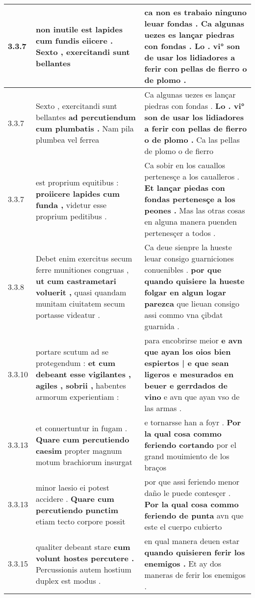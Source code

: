 \begin{tabular}{|p{1cm}|p{6.5cm}|p{6.5cm}|}
3.3.7 & non inutile est lapides \textbf{ cum fundis eiicere . } Sexto , exercitandi sunt bellantes & ca non es trabaio ninguno leuar fondas . \textbf{ Ca algunas uezes es lançar piedras con fondas . } Lo . vi° son de usar los lidiadores a ferir con pellas de fierro o de plomo . \\\hline
3.3.7 & Sexto , exercitandi sunt bellantes \textbf{ ad percutiendum cum plumbatis . } Nam pila plumbea vel ferrea & Ca algunas uezes es lançar piedras con fondas . \textbf{ Lo . vi° son de usar los lidiadores a ferir con pellas de fierro o de plomo . } Ca las pellas de plomo o de fierro \\\hline
3.3.7 & est proprium equitibus : \textbf{ proiicere lapides cum funda , } videtur esse proprium peditibus . & Ca sobir en los cauallos pertenesçe a los caualleros . \textbf{ Et lançar piedas con fondas pertenesçe a los peones . } Mas las otras cosas en alguna manera puenden pertenesçer a todos . \\\hline
3.3.8 & Debet enim exercitus secum ferre munitiones congruas , \textbf{ ut cum castrametari voluerit , } quasi quandam munitam ciuitatem secum portasse videatur . & Ca deue sienpre la hueste leuar consigo guarniciones conuenibles . \textbf{ por que quando quisiere la hueste folgar en algun logar parezca } que lieuan consigo assi commo vna çibdat guarnida . \\\hline
3.3.10 & portare scutum ad se protegendum : \textbf{ et cum debeant esse vigilantes , agiles , sobrii , } habentes armorum experientiam : & para encobrirse meior \textbf{ e avn que ayan los oios bien espiertos | e que sean ligeros e mesurados en beuer e gerrdados de vino } e avn que ayan vso de las armas . \\\hline
3.3.13 & et conuertuntur in fugam . \textbf{ Quare cum percutiendo caesim } propter magnum motum brachiorum insurgat & e tornarsse han a foyr . \textbf{ Por la qual cosa commo feriendo cortando } por el grand mouimiento de los braços \\\hline
3.3.13 & minor laesio ei potest accidere . \textbf{ Quare cum percutiendo punctim } etiam tecto corpore possit & por que assi feriendo menor daño le puede contesçer . \textbf{ Por la qual cosa commo feriendo de punta } avn que este el cuerpo cubierto \\\hline
3.3.15 & qualiter debeant stare \textbf{ cum volunt hostes percutere . } Percussionis autem hostium duplex est modus . & en qual manera deuen estar \textbf{ quando quisieren ferir los enemigos . } Et ay dos maneras de ferir los enemigos . \\\hline

\end{tabular}
